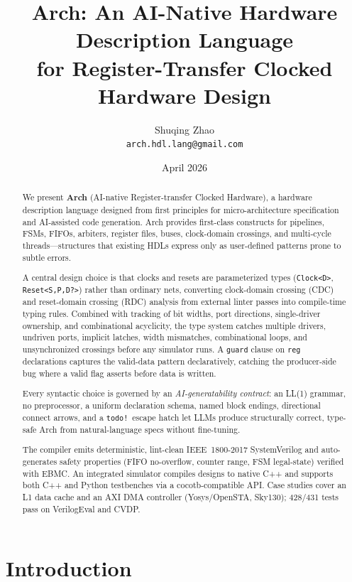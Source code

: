 \documentclass[11pt,twocolumn]{article}
\title{\textbf{Arch: An AI-Native Hardware Description Language\\for Register-Transfer Clocked Hardware Design}}
\author{
  Shuqing Zhao \\
  \texttt{arch.hdl.lang@gmail.com}
}
\date{April 2026}
\begin{document}
\maketitle

\begin{abstract}
We present \textbf{Arch} (AI-native Register-transfer Clocked Hardware), a hardware description language designed from first principles for micro-architecture specification and AI-assisted code generation. Arch provides first-class constructs for pipelines, FSMs, FIFOs, arbiters, register files, buses, clock-domain crossings, and multi-cycle threads---structures that existing HDLs express only as user-defined patterns prone to subtle errors.

A central design choice is that clocks and resets are parameterized types (\texttt{Clock<D>}, \texttt{Reset<S,P,D?>}) rather than ordinary nets, converting clock-domain crossing (CDC) and reset-domain crossing (RDC) analysis from external linter passes into compile-time typing rules. Combined with tracking of bit widths, port directions, single-driver ownership, and combinational acyclicity, the type system catches multiple drivers, undriven ports, implicit latches, width mismatches, combinational loops, and unsynchronized crossings before any simulator runs. A \texttt{guard} clause on \texttt{reg} declarations captures the valid-data pattern declaratively, catching the producer-side bug where a valid flag asserts before data is written.

Every syntactic choice is governed by an \emph{AI-generatability contract}: an LL(1) grammar, no preprocessor, a uniform declaration schema, named block endings, directional connect arrows, and a \texttt{todo!}\ escape hatch let LLMs produce structurally correct, type-safe Arch from natural-language specs without fine-tuning.

The compiler emits deterministic, lint-clean IEEE~1800-2017 SystemVerilog and auto-generates safety properties (FIFO no-overflow, counter range, FSM legal-state) verified with EBMC. An integrated simulator compiles designs to native C++ and supports both C++ and Python testbenches via a cocotb-compatible API. Case studies cover an L1 data cache and an AXI DMA controller (Yosys/OpenSTA, Sky130); 428/431 tests pass on VerilogEval and CVDP.
\end{abstract}

\section{Introduction}\label{sec:intro}
\end{document}
